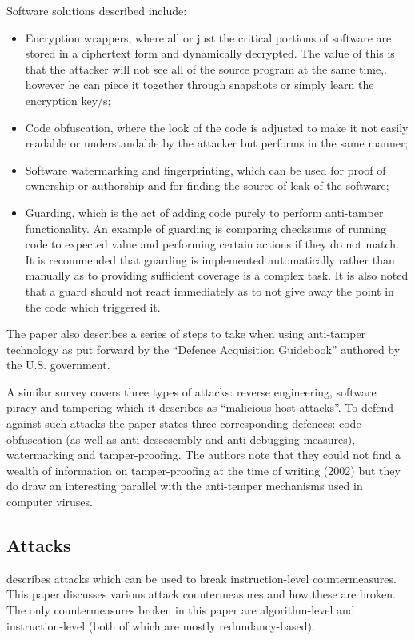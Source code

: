 Software solutions described include:
\begin{itemize}
	\item Encryption wrappers, where all or just the critical portions of software are stored in a ciphertext form and dynamically decrypted.  The value of this is that the attacker will not see all of the source program at the same time,. however he can piece it together through snapshots or simply learn the encryption key/s;
	\item Code obfuscation, where the look of the code is adjusted to make it not easily readable or understandable by the attacker but performs in the same manner;
	\item Software watermarking and fingerprinting, which can be used for proof of ownership or authorship and for finding the source of leak of the software;
	\item Guarding, which is the act of adding code purely to perform anti-tamper functionality. An example of guarding is comparing checksums of running code to expected value and performing certain actions if they do not match. It is recommended that guarding is implemented automatically rather than manually as to providing sufficient coverage is a complex task. It is also noted that a guard should not react immediately as to not give away the point in the code which triggered it.
\end{itemize}
The paper also describes a series of steps to take when using anti-tamper technology as put forward by the ``Defence Acquisition Guidebook'' authored by the U.S. government.

A similar survey \cite{Collberg2002} covers three types of attacks: reverse engineering, software piracy and tampering which it describes as ``malicious host attacks''. To defend against such attacks the paper states three corresponding defences: code obfuscation (as well as anti-dessesembly and anti-debugging measures), watermarking and tamper-proofing. The authors note that they could not find a wealth of information on tamper-proofing at the time of writing (2002) but they do draw an interesting parallel with the anti-temper mechanisms used in computer viruses.  

\subsection{Attacks}

\cite{Yuce2016a} describes attacks which can be used to break instruction-level countermeasures. This paper discusses various attack countermeasures and how these are broken. The only countermeasures broken in this paper are algorithm-level and instruction-level (both of which are mostly redundancy-based).

